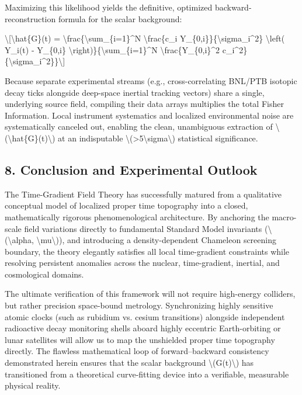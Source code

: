 \documentclass[
  10pt,
]{article}
\begin{document}
Maximizing this likelihood yields the definitive, optimized
backward-reconstruction formula for the scalar background:

\textbackslash{[}\textbackslash hat\{G\}(t) =
\textbackslash frac\{\textbackslash sum\_\{i=1\}\^{}N
\textbackslash frac\{c\_i Y\_\{0,i\}\}\{\textbackslash sigma\_i\^{}2\}
\textbackslash left( Y\_i(t) - Y\_\{0,i\}
\textbackslash right)\}\{\textbackslash sum\_\{i=1\}\^{}N
\textbackslash frac\{Y\_\{0,i\}\^{}2
c\_i\^{}2\}\{\textbackslash sigma\_i\^{}2\}\}\textbackslash{]}

Because separate experimental streams (e.g., cross-correlating BNL/PTB
isotopic decay ticks alongside deep-space inertial tracking vectors)
share a single, underlying source field, compiling their data arrays
multiplies the total Fisher Information. Local instrument systematics
and localized environmental noise are systematically canceled out,
enabling the clean, unambiguous extraction of
\textbackslash(\textbackslash hat\{G\}(t)\textbackslash) at an
indisputable
\textbackslash(\textgreater5\textbackslash sigma\textbackslash)
statistical significance.

\hypertarget{conclusion-and-experimental-outlook}{%
\subsection{8. Conclusion and Experimental
Outlook}\label{conclusion-and-experimental-outlook}}

The Time-Gradient Field Theory has successfully matured from a
qualitative conceptual model of localized proper time topography into a
closed, mathematically rigorous phenomenological architecture. By
anchoring the macro-scale field variations directly to fundamental
Standard Model invariants (\textbackslash(\textbackslash alpha,
\textbackslash mu\textbackslash)), and introducing a density-dependent
Chameleon screening boundary, the theory elegantly satisfies all local
time-gradient constraints while resolving persistent anomalies across
the nuclear, time-gradient, inertial, and cosmological domains.

The ultimate verification of this framework will not require high-energy
colliders, but rather precision space-bound metrology. Synchronizing
highly sensitive atomic clocks (such as rubidium vs. cesium transitions)
alongside independent radioactive decay monitoring shells aboard highly
eccentric Earth-orbiting or lunar satellites will allow us to map the
unshielded proper time topography directly. The flawless mathematical
loop of forward--backward consistency demonstrated herein ensures that
the scalar background \textbackslash(G(t)\textbackslash) has
transitioned from a theoretical curve-fitting device into a verifiable,
measurable physical reality.
\end{document}
